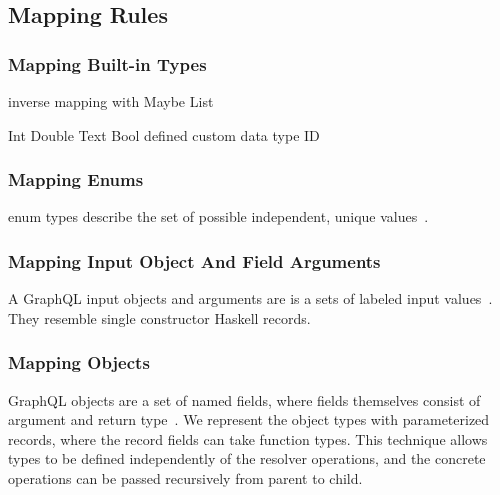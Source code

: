 
\subsection{Mapping Rules}

\begin{frame}\frametitle{Mapping Built-in Types}
\begin{itemize}
  \begin{itemize}
     inverse mapping with Maybe
     List
  \end{itemize}
  \begin{itemize}
     Int
     Double
     Text
     Bool
      defined custom data type ID 
  \end{itemize}
\end{itemize}
\end{frame}

\begin{frame}\frametitle{Mapping Enums}

enum types describe the set of possible independent, unique values~\cite{gql-spec}.



\end{frame}

\begin{frame}\frametitle{Mapping Input Object And Field Arguments}

A GraphQL input objects and arguments are is a sets of labeled input values~\cite{gql-spec}. They resemble single constructor Haskell records. 


\end{frame}
\begin{frame}[allowframebreaks]\frametitle{Mapping Objects}

GraphQL objects are a set of named fields, where fields themselves consist of argument and return type~\cite{gql-spec}. We represent the object types with parameterized records, where the record fields can take function types. This technique allows types to be defined independently of the resolver operations, and the concrete operations can be passed recursively from parent to child. 



\end{frame}

